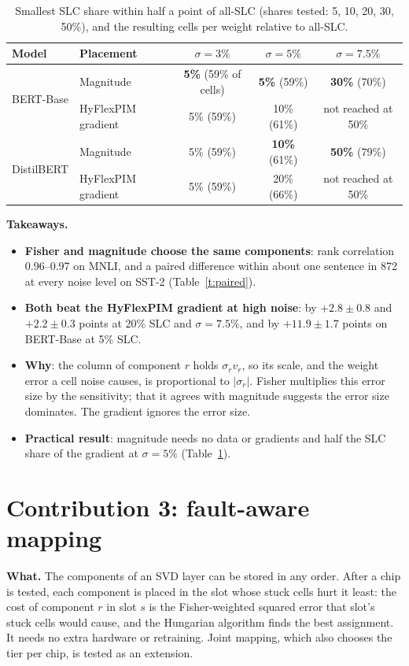 \documentclass[10pt,a4paper]{article}
\newcommand{\gain}[1]{\textcolor{cmag}{\textbf{#1}}}
\begin{document}
\begin{table}[H]
\centering\small
\caption{Smallest SLC share within half a point of all-SLC (shares tested: 5, 10, 20, 30, 50\%), and the
resulting cells per weight relative to all-SLC.}\label{t:need}
\begin{tabular}{@{}llccc@{}}
\toprule
Model & Placement & $\sigma=3\%$ & $\sigma=5\%$ & $\sigma=7.5\%$ \\
\midrule
\multirow{2}{*}{BERT-Base} & Magnitude & \gain{5\%} (59\% of cells) & \gain{5\%} (59\%) & \gain{30\%} (70\%) \\
 & HyFlexPIM gradient & 5\% (59\%) & 10\% (61\%) & not reached at 50\% \\
\midrule
\multirow{2}{*}{DistilBERT} & Magnitude & 5\% (59\%) & \gain{10\%} (61\%) & \gain{50\%} (79\%) \\
 & HyFlexPIM gradient & 5\% (59\%) & 20\% (66\%) & not reached at 50\% \\
\bottomrule
\end{tabular}
\end{table}

\noindent\textbf{Takeaways.}
\begin{itemize}
\item \textbf{Fisher and magnitude choose the same components}: rank correlation 0.96--0.97 on MNLI, and a paired
difference within about one sentence in 872 at every noise level on SST-2 (Table~\ref{t:paired}).
\item \textbf{Both beat the HyFlexPIM gradient at high noise}: by $+2.8\pm0.8$ and $+2.2\pm0.3$ points at 20\% SLC and
$\sigma=7.5\%$, and by $+11.9\pm1.7$ points on BERT-Base at 5\% SLC.
\item \textbf{Why}: the column of component $r$ holds $\sigma_r v_r$, so its scale, and the weight error a cell
noise causes, is proportional to $|\sigma_r|$. Fisher multiplies this error size by the sensitivity; that it
agrees with magnitude suggests the error size dominates. The gradient ignores the error size.
\item \textbf{Practical result}: magnitude needs no data or gradients and half the SLC share of the gradient at
$\sigma=5\%$ (Table~\ref{t:need}).
\end{itemize}

\section{Contribution 3: fault-aware mapping}
\textbf{What.} The components of an SVD layer can be stored in any order. After a chip is tested, each
component is placed in the slot whose stuck cells hurt it least: the cost of component $r$ in slot $s$ is the
Fisher-weighted squared error that slot's stuck cells would cause, and the Hungarian algorithm finds the best
assignment. It needs no extra hardware or retraining. Joint mapping, which also chooses the tier per chip, is
tested as an extension.
\end{document}
